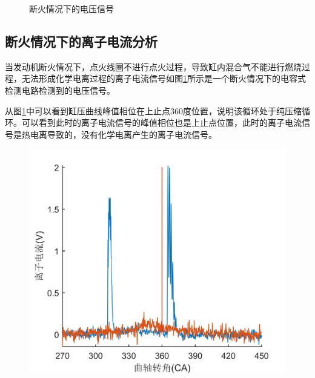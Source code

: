 \begin{figure}[H]
\begin{minipage}[t]{0.5\linewidth}
	\caption{断火情况下的电压信号}
	\label{fig:dh_ion}
\end{minipage}
\end{figure}
\subsection{断火情况下的离子电流分析}   
当发动机断火情况下，点火线圈不进行点火过程，导致缸内混合气不能进行燃烧过程，无法形成化学电离过程的离子电流信号如图\ref{fig:dh_ion}所示是一个断火情况下的电容式检测电路检测到的电压信号。
\par 从图\ref{fig:dh_ion}中可以看到缸压曲线峰值相位在上止点360度位置，说明该循环处于纯压缩循环。可以看到此时的离子电流信号的峰值相位也是上止点位置，此时的离子电流信号是热电离导致的，没有化学电离产生的离子电流信号。
\begin{figure}[htb]
\begin{minipage}[t]{0.5\linewidth}
	\centering
	\includegraphics[width=\textwidth]{thesis_figure/ion_chapter/diff_dy_dh}
\end{minipage}
\begin{minipage}[t]{0.5\linewidth}
	\centering

\end{minipage}
\end{figure}
